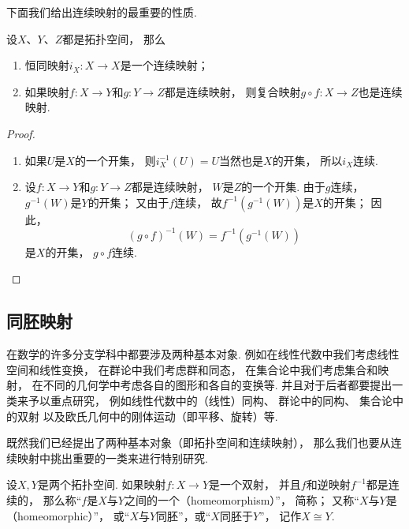 下面我们给出连续映射的最重要的性质.

\begin{theorem}\label{theorem:拓扑学.拓扑空间之间的连续映射的性质}
设\(X\)、\(Y\)、\(Z\)都是拓扑空间，
那么\begin{enumerate}
	\item 恒同映射\(i_X\colon X \to X\)是一个连续映射；
	\item 如果映射\(f\colon X \to Y\)和\(g\colon Y \to Z\)都是连续映射，
	则复合映射\(g \circ f\colon X \to Z\)也是连续映射.
\end{enumerate}
\begin{proof}
\begin{enumerate}
	\item 如果\(U\)是\(X\)的一个开集，
	则\(i_X^{-1}(U) = U\)当然也是\(X\)的开集，
	所以\(i_X\)连续.

	\item 设\(f\colon X \to Y\)和\(g\colon Y \to Z\)都是连续映射，
	\(W\)是\(Z\)的一个开集.
	由于\(g\)连续，
	\(g^{-1}(W)\)是\(Y\)的开集；
	又由于\(f\)连续，
	故\(f^{-1}(g^{-1}(W))\)是\(X\)的开集；
	因此，\[
		(g \circ f)^{-1}(W) = f^{-1}(g^{-1}(W))
	\]是\(X\)的开集，
	\(g \circ f\)连续.
	\qedhere
\end{enumerate}
\end{proof}
\end{theorem}

\subsection{同胚映射}
在数学的许多分支学科中都要涉及两种基本对象.
例如在线性代数中我们考虑线性空间和线性变换，
在群论中我们考虑群和同态，
在集合论中我们考虑集合和映射，
在不同的几何学中考虑各自的图形和各自的变换等.
并且对于后者都要提出一类来予以重点研究，
例如线性代数中的（线性）同构、
群论中的同构、
集合论中的双射
以及欧氏几何中的刚体运动（即平移、旋转）等.

既然我们已经提出了两种基本对象（即拓扑空间和连续映射），
那么我们也要从连续映射中挑出重要的一类来进行特别研究.

\begin{definition}\label{definition:拓扑学.同胚映射的概念}
设\(X,Y\)是两个拓扑空间.
如果映射\(f\colon X \to Y\)是一个双射，
并且\(f\)和逆映射\(f^{-1}\)都是连续的，
那么称“\(f\)是\(X\)与\(Y\)之间的一个（homeomorphism）”，
简称；
又称“\(X\)与\(Y\)是（homeomorphic）”，
或“\(X\)与\(Y\)同胚”，或“\(X\)同胚于\(Y\)”，
记作\(X \cong Y\).
\end{definition}


